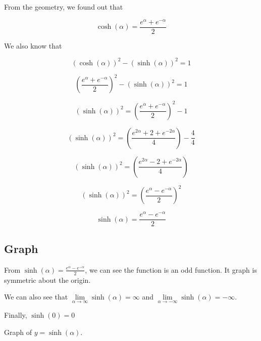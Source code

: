 \documentclass{ximera}
\begin{document}
From the geometry, we found out that






 \[    \cosh(\alpha) = \frac{ e^{\alpha} + e^{-\alpha}}{2}    \]


We also know that 


\[    (\cosh(\alpha))^2 - (\sinh(\alpha))^2 = 1  \]



\[    \left(\frac{ e^{\alpha} + e^{-\alpha}}{2}\right)^2    -   (\sinh(\alpha))^2 = 1  \]



\[    (\sinh(\alpha))^2 =  \left(\frac{ e^{\alpha} + e^{-\alpha}}{2}\right)^2  - 1 \]


\[    (\sinh(\alpha))^2 =    \left(\frac{ e^{2\alpha} + 2 + e^{-2\alpha}}{4}\right)  - \frac{4}{4} \]


\[    (\sinh(\alpha))^2 =    \left(\frac{ e^{2\alpha} - 2 + e^{-2\alpha}}{4}\right)   \]

\[    (\sinh(\alpha))^2 =    \left(\frac{ e^{\alpha} -  e^{-\alpha}}{2}\right)^2   \]

\[    \sinh(\alpha) =    \frac{ e^{\alpha} -  e^{-\alpha}}{2}   \]


















\subsection{Graph}





From  $\sinh(\alpha) = \frac{ e^{\alpha} - e^{-\alpha}}{2}$, we can see the function is an odd function.  It graph is symmetric about the origin.



We can also see that $\lim\limits_{\alpha \to \infty} \sinh(\alpha) = \infty$ and $\lim\limits_{\alpha \to -\infty} \sinh(\alpha) = -\infty$.

Finally, $\sinh(0) = 0$





Graph of $y = \sinh(\alpha)$.
\end{document}
